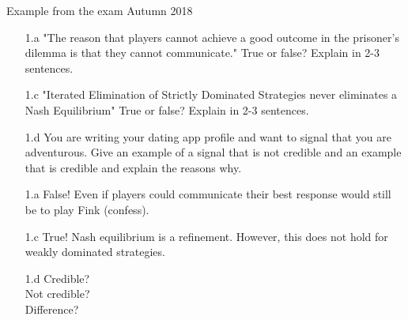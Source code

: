 \begin{frame}{Example from the exam Autumn 2018}
\begin{multicols}{2}\color{lightgray}
  \begin{itemize}\color{lightgray}
    \item[\color{lightgray}1.a] "The reason that players cannot achieve a good outcome in the prisoner’s dilemma is that they cannot communicate." True or false? Explain in 2-3 sentences.
    \item[\color{lightgray}1.c] "Iterated Elimination of Strictly Dominated Strategies never eliminates a Nash Equilibrium" True or false? Explain in 2-3 sentences.
    \item[1.d] \color{black}You are writing your dating app profile and want to signal that you are adventurous. Give an example of a signal that is not credible and an example that is credible and explain the reasons why.
  \end{itemize}
\vfill\null \columnbreak
\begin{itemize}\color{lightgray}
  \item[\color{lightgray}1.a] False! Even if players could communicate their best response would still be to play Fink (confess).
  \item[\color{lightgray}1.c] True! Nash equilibrium is a refinement. However, this does not hold for
weakly dominated strategies.
  \item[1.d] \color{black} Credible? \\ Not credible? \\ Difference?
\end{itemize}
\end{multicols}
\end{frame}


